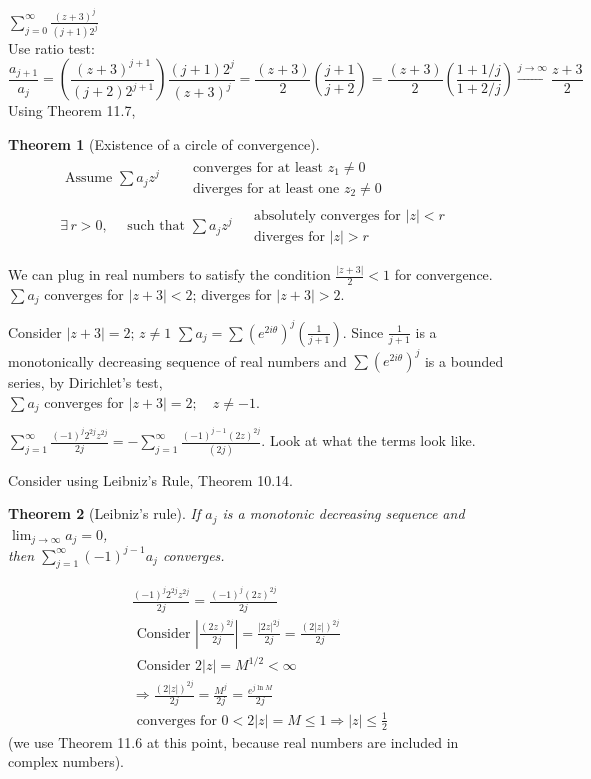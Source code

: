 \documentclass[twoside]{amsart}
\theoremstyle{plain}
\newtheorem{theorem}{Theorem}
\theoremstyle{definition}
\newcommand{\exercisehead}[1]
  {\smallskip
   \noindent{\small\bf Exercise #1.}}
\begin{document}
\exercisehead{3} $\sum_{j=0}^{\infty} \frac{(z+3)^j }{ (j+1)2^j }$ \\
Use ratio test: 
\[
\frac{ a_{j+1}}{a_j} = \left( \frac{ (z+3)^{j+1}}{ (j+2)2^{j+1} } \right) \frac{ (j+1) 2^j }{ (z+3)^j } = \frac{ (z+3)}{2} \left( \frac{j+1}{j+2} \right) = \frac{(z+3)}{2} \left( \frac{1 + 1/j}{ 1+2/j} \right) \xrightarrow{j\to \infty} \frac{z+3}{2}
\]
Using Theorem 11.7, 
\begin{theorem}[Existence of a circle of convergence]
\[
\begin{gathered}
\text{ Assume $\sum a_j z^j$ } \,  \begin{aligned} & \text{ converges for at least $z_1 \neq 0$ } \\
  & \text{ diverges for at least one $z_2 \neq 0 $ } \end{aligned} \\
\exists \, r > 0, \quad \text{ such that } \sum a_j z^j \begin{aligned} & \text{ absolutely converges for $|z| < r$ } \\
  & \text{ diverges for $|z| > r $ } 
\end{aligned}
\end{gathered} 
\]
\end{theorem}

We can plug in real numbers to satisfy the condition $\frac{ |z+3|}{2} < 1$ for convergence.  \\
$\sum a_j$ converges for $|z+3| < 2$; \quad diverges for $|z+3| > 2$.  

Consider $|z+3| = 2$; \quad $z \neq 1$
$\sum a_j = \sum (e^{2i \theta})^j \left( \frac{1}{j+1} \right)$.  Since $\frac{1}{j+1}$ is a monotonically decreasing sequence of real numbers and $\sum (e^{2i \theta})^j$ is a bounded series, by Dirichlet's test, \\
$\sum a_j$ converges for $|z+3| = 2; \quad z\neq -1$.  

\exercisehead{4} $\sum_{j=1}^{\infty} \frac{ (-1)^j 2^{2j} z^{2j}}{ 2j } = - \sum_{j=1}^{\infty} \frac{ (-1)^{j-1} (2z)^{2j}}{ (2j) }$.  Look at what the terms look like.  

Consider using Leibniz's Rule, Theorem 10.14.  
\begin{theorem}[Leibniz's rule]
  If $a_j$ is a monotonic decreasing sequence and $\lim_{j\to \infty} a_j=0$, \\
  \phantom{ If } then $\sum_{j=1}^{\infty} (-1)^{j-1} a_j $ converges.  
\end{theorem}
\[
\begin{gathered}
  \frac{ (-1)^j 2^{2j} z^{2j} }{ 2j} = \frac{ (-1)^j (2z)^{2j} }{ 2j } \\
  \text{ Consider } \left| \frac{ (2z)^{2j} }{ 2j } \right| = \frac{ |2z|^{2j}}{ 2j } = \frac{ (2|z|)^{2j} }{2j } \\
  \text{ Consider } 2|z| = M^{1/2} < \infty \\
  \Longrightarrow \frac{ (2|z|)^{2j}}{ 2j} = \frac{ M^j }{ 2j } = \frac{ e^{j \ln{ M}}}{ 2j } \\
  \text{ converges for } 0 < 2 |z| = M \leq 1 \Longrightarrow |z| \leq \frac{1}{2} 
\end{gathered}
\]
(we use Theorem 11.6 at this point, because real numbers are included in complex numbers).  
\end{document}

